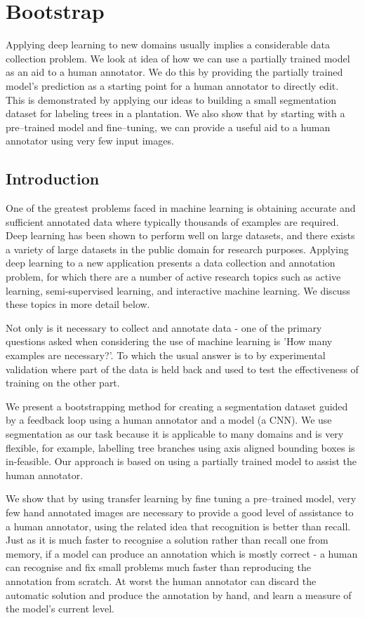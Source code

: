 


\chapter{Bootstrap}
 
Applying deep learning to new domains usually implies a considerable data collection problem. We look at idea of how we can use a partially trained model as an aid to a human annotator. We do this by providing the partially trained model's prediction as a starting point for a human annotator to directly edit. This is demonstrated by applying our ideas to building a small segmentation dataset for labeling trees in a plantation. We also show that by starting with a pre--trained model and fine--tuning, we can provide a useful aid to a human annotator using very few input images.


\section {Introduction}


One of the greatest problems faced in machine learning is obtaining accurate and sufficient annotated data where typically thousands of examples are required. Deep learning has been shown to perform well on large datasets, and there exists a variety of large datasets in the public domain for research purposes. Applying deep learning to a new application presents a data collection and annotation problem, for which there are a number of active research topics such as active learning, semi-supervised learning, and interactive machine learning. We discuss these topics in more detail below.

Not only is it necessary to collect and annotate data - one of the primary questions asked when considering the use of machine learning is 'How many examples are necessary?'. To which the usual answer is to by experimental validation where part of the data is held back and used to test the effectiveness of training on the other part.

We present a bootstrapping method for creating a segmentation dataset guided by a feedback loop using a human annotator and a model (a \gls{CNN}). We use segmentation as our task because it is applicable to many domains and is very flexible, for example, labelling tree branches using axis aligned bounding boxes is in-feasible. Our approach is based on using a partially trained model to assist the human annotator.

We show that by using transfer learning by fine tuning a pre--trained model, very few hand annotated images are necessary to provide a good level of assistance to a human annotator, using the related idea that recognition is better than recall. Just as it is much faster to recognise a solution rather than recall one from memory, if a model can produce an annotation which is mostly correct - a human can recognise and fix small problems much faster than reproducing the annotation from scratch. At worst the human annotator can discard the automatic solution and produce the annotation by hand, and learn a measure of the model's current level.

